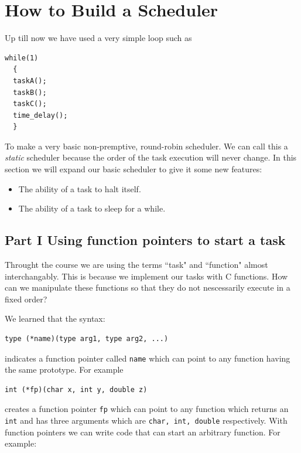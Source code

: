 \documentclass{article}	%
\begin{document}
\maketitle	%


\section{How to Build a Scheduler}	%
Up till now we have used a very simple loop such as 
\begin{verbatim}
while(1)
  {
  taskA();
  taskB();
  taskC();
  time_delay();
  }
\end{verbatim}

To make a very basic non-premptive, round-robin scheduler.   We can call this a {\it static} scheduler because the order of the task execution will never change. 
In this section we will expand our basic scheduler to give it some new features: 

\begin{itemize}
  \item The ability of a task to halt itself.
  \item The ability of a task to sleep for a while.
\end{itemize}


\subsection{Part I   Using function pointers to start a task}

Throught the course we are using the terms ``task" and ``function" almost interchangably.    This is because we implement our tasks with C functions. 	%
How can we manipulate these functions so that they do not nescessarily execute in a fixed order?  


We learned that the syntax:

\begin{verbatim}
type (*name)(type arg1, type arg2, ...)
\end{verbatim}
indicates a function pointer called {\tt name} which can point to any function having the same prototype.   For example

\begin{verbatim}
int (*fp)(char x, int y, double z)
\end{verbatim}

creates a function pointer {\tt fp} which can point to any function which returns an {\tt int} and has three arguments which are {\tt char, int, double} respectively.  With function pointers we can write code that can start an arbitrary function.   For example:	%
\end{document}
